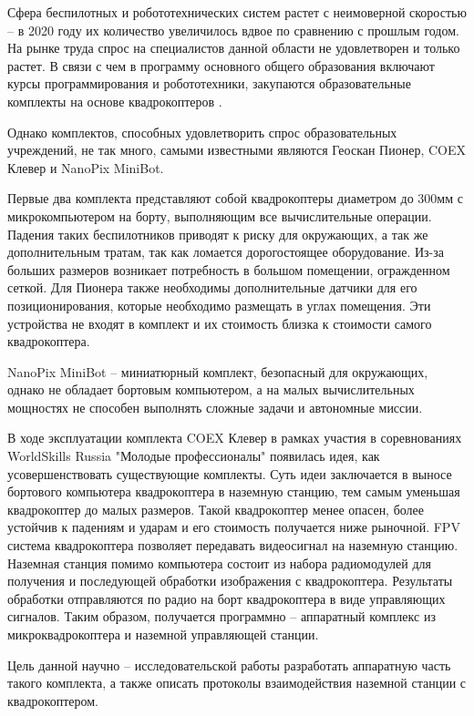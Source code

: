 Сфера беспилотных и робототехнических систем растет с неимоверной скоростью -- в 2020 году их количество увеличилось вдвое по сравнению с прошлым годом. На рынке труда спрос на специалистов данной области не удовлетворен и только растет. В связи с чем в программу основного общего образования включают курсы программирования и робототехники, закупаются образовательные комплекты на основе квадрокоптеров \cite{minobr}.

Однако комплектов, способных удовлетворить спрос образовательных учреждений, не так много, самыми известными являются Геоскан Пионер, COEX Клевер и NanoPix MiniBot.

Первые два комплекта представляют собой квадрокоптеры диаметром до 300мм с микрокомпьютером на борту, выполняющим все вычислительные операции. Падения таких беспилотников приводят к риску для окружающих, а так же дополнительным тратам, так как ломается дорогостоящее оборудование. Из-за больших размеров возникает потребность в большом помещении, огражденном сеткой. Для Пионера также необходимы дополнительные датчики для его позиционирования, которые необходимо размещать в углах помещения. Эти устройства не входят в комплект и их стоимость близка к стоимости самого квадрокоптера.

NanoPix MiniBot -- миниатюрный комплект, безопасный для окружающих, однако не обладает бортовым компьютером, а на малых вычислительных мощностях не способен выполнять сложные задачи и автономные миссии.

В ходе эксплуатации комплекта COEX Клевер в рамках участия в соревнованиях WorldSkills Russia "Молодые профессионалы" появилась идея, как усовершенствовать существующие комплекты.
Суть идеи заключается в выносе бортового компьютера квадрокоптера в наземную станцию, тем самым уменьшая квадрокоптер до малых размеров. Такой квадрокоптер менее опасен, более устойчив к падениям и ударам и его стоимость получается ниже рыночной. FPV система квадрокоптера позволяет передавать видеосигнал на наземную станцию. Наземная станция помимо компьютера состоит из набора радиомодулей для получения и последующей обработки изображения с квадрокоптера. Результаты обработки отправляются по радио на борт квадрокоптера в виде управляющих сигналов. Таким образом, получается программно -- аппаратный комплекс из микроквадрокоптера и наземной управляющей станции.

Цель данной научно -- исследовательской работы разработать аппаратную часть такого комплекта, а также описать протоколы взаимодействия наземной станции с квадрокоптером.
